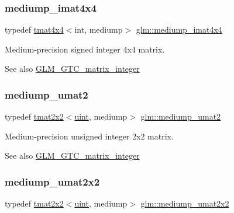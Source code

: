 \subsubsection{\texorpdfstring{mediump\+\_\+imat4x4}{mediump\_imat4x4}}
{\footnotesize\ttfamily typedef \hyperlink{structglm_1_1tmat4x4}{tmat4x4}$<$int, mediump$>$ \hyperlink{group__gtc__matrix__integer_gae226af929e72730be59a58d89a4be028}{glm\+::mediump\+\_\+imat4x4}}

Medium-\/precision signed integer 4x4 matrix. \begin{DoxySeeAlso}{See also}
\hyperlink{group__gtc__matrix__integer}{G\+L\+M\+\_\+\+G\+T\+C\+\_\+matrix\+\_\+integer} 
\end{DoxySeeAlso}
\mbox{\label{group__gtc__matrix__integer_ga85bc35173415dba31bb964c2940feeec}} 
\subsubsection{\texorpdfstring{mediump\+\_\+umat2}{mediump\_umat2}}
{\footnotesize\ttfamily typedef \hyperlink{structglm_1_1tmat2x2}{tmat2x2}$<$\hyperlink{group__core__precision_ga4fd29415871152bfb5abd588334147c8}{uint}, mediump$>$ \hyperlink{group__gtc__matrix__integer_ga85bc35173415dba31bb964c2940feeec}{glm\+::mediump\+\_\+umat2}}

Medium-\/precision unsigned integer 2x2 matrix. \begin{DoxySeeAlso}{See also}
\hyperlink{group__gtc__matrix__integer}{G\+L\+M\+\_\+\+G\+T\+C\+\_\+matrix\+\_\+integer} 
\end{DoxySeeAlso}
\mbox{\label{group__gtc__matrix__integer_gafce8777b8b0d9d7f810853b22de3be1b}} 
\subsubsection{\texorpdfstring{mediump\+\_\+umat2x2}{mediump\_umat2x2}}
{\footnotesize\ttfamily typedef \hyperlink{structglm_1_1tmat2x2}{tmat2x2}$<$\hyperlink{group__core__precision_ga4fd29415871152bfb5abd588334147c8}{uint}, mediump$>$ \hyperlink{group__gtc__matrix__integer_gafce8777b8b0d9d7f810853b22de3be1b}{glm\+::mediump\+\_\+umat2x2}}

